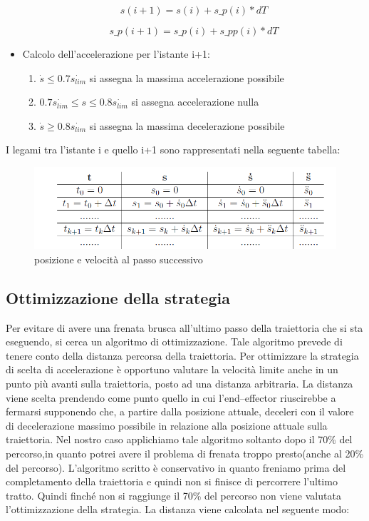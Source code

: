 \documentclass{article}
\begin{document}
\begin{itemize}
    \begin{equation*}
        s(i+1) = s(i) + s\_p(i)*dT
    \end{equation*}

    \begin{equation*}
        s\_p(i+1) = s\_p(i) + s\_pp(i)*dT
    \end{equation*}
    
    \item Calcolo dell'accelerazione per l'istante i+1:\\
    \begin{enumerate}
    \item  $ \dot{s} \leq 0.7 \dot{s_{lim}} $ si assegna la massima accelerazione possibile
    \item $ 0.7 \dot{s_{lim}} \leq s \leq 0.8  \dot{s_{lim}}$ si assegna accelerazione nulla
    \item $ \dot{s} \geq 0.8 \dot{s_{lim}} $ si assegna la massima decelerazione possibile
    \end{enumerate}
\end{itemize}
I legami tra l'istante i e quello i+1 sono rappresentati nella seguente tabella:

\begin{figure}[H]
\centering
\includegraphics[width=.9\textwidth]{./strategia/datisuc.png}
\caption{ posizione e velocità al passo successivo}
\end{figure}

\subsection{ Ottimizzazione della strategia}
Per evitare di avere una frenata brusca all'ultimo passo della traiettoria che si sta eseguendo, si cerca un algoritmo di ottimizzazione. Tale algoritmo prevede di tenere conto della distanza percorsa della traiettoria.
Per ottimizzare la strategia di scelta di accelerazione è opportuno valutare la velocità limite anche in un punto più avanti sulla traiettoria, posto ad una distanza arbitraria.
La distanza viene scelta prendendo come punto quello in cui l’end–effector riuscirebbe a fermarsi supponendo che, a partire dalla posizione attuale, deceleri con il valore di decelerazione massimo possibile in relazione alla posizione attuale sulla traiettoria. Nel nostro caso applichiamo tale algoritmo soltanto dopo il 70\% del percorso,in quanto potrei avere il problema di  frenata troppo presto(anche al 20\% del percorso). L'algoritmo scritto è conservativo in quanto freniamo prima del completamento della traiettoria e quindi non si  finisce di percorrere l'ultimo tratto.
Quindi finché non si raggiunge il 70\% del percorso non viene valutata l'ottimizzazione della strategia. La distanza viene calcolata nel seguente modo:
\end{document}
